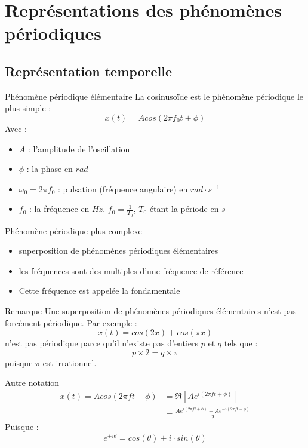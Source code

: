 \documentclass[a4paper,11pt]{beamer}
\begin{document}
\section[Rep. des phénomènes périodiques]{Représentations des phénomènes
périodiques}
\subsection{Représentation temporelle}

\begin{frame}
\begin{block}{Phénomène périodique élémentaire}
La cosinusoïde est le phénomène périodique le plus simple :
$$x(t) = Acos(2\pi f_0 t + \phi)$$
Avec :
\begin{itemize}[label=$\bullet$]
  \item $A$ : l'amplitude de l'oscillation
  \item $\phi$ : la phase en $rad$
  \item $\omega_0=2\pi f_0$ : pulsation (fréquence angulaire) en $rad\cdot
  s^{-1}$
  \item $f_0$ : la fréquence en $Hz$. $f_0 = \frac{1}{T_0}$, $T_0$ étant la
  période en $s$
\end{itemize}
\end{block}
\pause
\begin{alertblock}{Phénomène périodique plus complexe}
\begin{itemize}[label=$\bullet$]
  \item superposition de phénomènes périodiques élémentaires
  \item les fréquences sont des multiples d'une fréquence de référence
  \item Cette fréquence est appelée la fondamentale
\end{itemize}
\end{alertblock}
\end{frame}

\begin{frame}
\begin{block}{Remarque}
\justify
Une superposition de phénomènes périodiques élémentaires n'est pas forcément
périodique. Par exemple :
$$
x(t) = cos(2x) + cos(\pi x)
$$ 
\justify
n'est pas périodique parce qu'il n'existe pas d'entiers $p$ et $q$ tels que :
$$
p\times 2 = q\times \pi
$$
\justify
puisque $\pi$ est irrationnel.
\end{block}
\end{frame}

\begin{frame}
\begin{block}{Autre notation}
$$
\begin{aligned}
x(t) = Acos(2\pi f t + \phi) &= \Re[A e^{i(2\pi ft +\phi)}]\\
& =\frac{A e^{i(2\pi ft + \phi)} + A e^{-i(2\pi ft+ \phi)}}{2} 
\end{aligned}
$$
Puisque :
$$
e^{\pm i\theta} = cos(\theta) \pm i\cdot sin(\theta)
$$
\end{block}
\end{frame}
\end{document}
